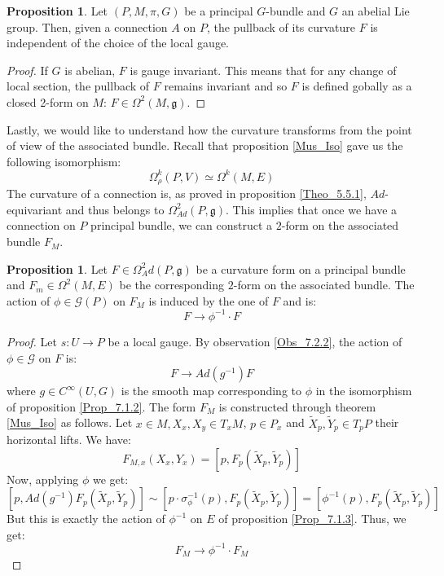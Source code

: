 \documentclass[12pt,a4paper]{report}
\theoremstyle{definition}
\theoremstyle{Theorem}
\newtheorem{Prop}[Def]{Proposition}
\theoremstyle{definition}
\theoremstyle{definition}
\begin{document}
	\begin{Prop}\label{Prop_7.2.2}
		Let $(P,M,\pi,G)$ be a principal $G$-bundle and $G$ an abelial Lie group. Then, given a connection $A$ on $P$, the pullback of its curvature $F$ is independent of the choice of the local gauge.
	\end{Prop}
	\begin{proof}
		If $G$ is abelian, $F$ is gauge invariant. This means that for any change of local section, the pullback of $F$ remains invariant and so $F$ is defined gobally as a closed 2-form on $M$: $F\in \Omega^2(M,\mathfrak{g})$.
	\end{proof}
	Lastly, we would like to understand how the curvature transforms from the point of view of the associated bundle. Recall that proposition \ref{Mus_Iso} gave us the following isomorphism:
	$$\Omega^k_\rho(P,V)\simeq \Omega^k(M,E)$$
	The curvature of a connection is, as proved in proposition \ref{Theo_5.5.1}, $Ad$-equivariant and thus belongs to $\Omega^2_{Ad}(P,\mathfrak{g})$. This implies that once we have a connection on $P$ principal bundle, we can construct a $2$-form on the associated bundle $F_M$.
	\begin{Prop}
		Let $F\in \Omega^2_Ad(P,\mathfrak{g})$ be a curvature form on a principal bundle and $F_m\in\Omega^2(M,E)$ be the corresponding $2$-form on the associated bundle. The action of $\phi\in\mathcal{G}(P)$ on $F_M$ is induced by the one of $F$ and is:
		$$F\rightarrow \phi^{-1}\cdot F$$
	\end{Prop}
	\begin{proof}
		Let $s:U\rightarrow P$ be a local gauge. By observation \ref{Obs_7.2.2}, the action of $\phi\in\mathcal{G}$ on $F$ is:
		$$F\rightarrow Ad(g^{-1})F$$
		where $g\in C^\infty(U,G)$ is the smooth map corresponding to $\phi$ in the isomorphism of proposition \ref{Prop_7.1.2}. The form $F_M$ is constructed through theorem \ref{Mus_Iso} as follows. Let $x\in M,X_x,X_y\in T_xM$, $p\in P_x$ and $\tilde{X}_p,\tilde{Y}_p\in T_pP$ their horizontal lifts. We have:
		$$F_{M,x}(X_x,Y_x)=[p,F_p(\tilde{X}_p,\tilde{Y}_p)]$$
		Now, applying $\phi$ we get:
		$$[p,Ad(g^{-1})F_p(\tilde{X}_p,\tilde{Y}_p)]\sim [p\cdot \sigma^{-1}_\phi(p),F_p(\tilde{X}_p,\tilde{Y}_p)]=[\phi^{-1}(p),F_p(\tilde{X}_p,\tilde{Y}_p)]$$
		But this is exactly the action of $\phi^{-1}$ on $E$ of proposition \ref{Prop_7.1.3}. Thus, we get:
		$$F_M\rightarrow \phi^{-1}\cdot F_M$$
	\end{proof}
\end{document}
